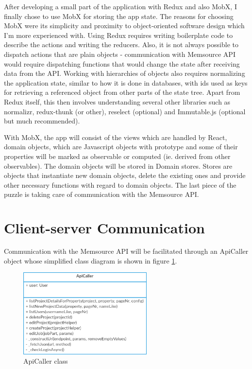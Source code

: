 


After developing a small part of the application with Redux and also MobX, I finally chose to use MobX for storing the app state. The reasons for choosing MobX were its simplicity and proximity to object-oriented software design which I'm more experienced with. 
Using Redux requires writing boilerplate code to describe the actions and writing the reducers. Also, it is not always possible to dispatch actions that are plain objects - communication with Memsource API would require dispatching functions that would change the state after receiving data from the API. Working with hierarchies of objects also requires normalizing the application state, similar to how it is done in databases, with ids used as keys for retrieving a referenced object from other parts of the state tree. Apart from Redux itself, this then involves understanding several other libraries such as normalizr, redux-thunk (or other), reselect (optional) and Immutable.js (optional but much recommended).


With MobX, the app will consist of the views which are handled by React, domain objects, which are Javascript objects with prototype and some of their properties will be marked as observable or computed (ie. derived from other observables). The domain objects will be stored in Domain stores. Stores are objects that instantiate new domain objects, delete the existing ones and provide other necessary functions with regard to domain objects. The last piece of the puzzle is taking care of communication with the Memsource API.

\section{Client-server Communication}

Communication with the Memsource API will be facilitated through an ApiCaller object whose simplified class diagram is shown in figure \ref{ApiCaller}.

\begin{figure}[H]
	\includegraphics[width=0.6\textwidth]{pics/ApiCaller}
	\caption{ApiCaller class}
	\label{ApiCaller}
\end{figure}


